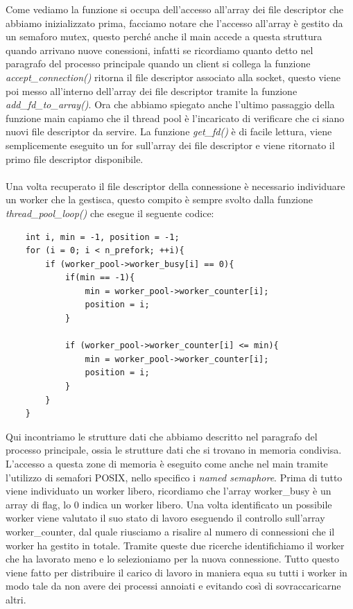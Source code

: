 \documentclass[italian]{tktltiki2}
\begin{document}
Come vediamo la funzione si occupa dell'accesso all'array dei file descriptor che abbiamo inizializzato prima, facciamo notare che l'accesso all'array è gestito da un semaforo mutex, questo perché anche il main accede a questa struttura quando arrivano nuove conessioni, infatti se ricordiamo quanto detto nel paragrafo del processo principale quando un client si collega la funzione \emph{accept\_connection()} ritorna il file descriptor associato alla socket, questo viene poi messo all'interno dell'array dei file descriptor tramite la funzione \emph{add\_fd\_to\_array()}. Ora che abbiamo spiegato anche l'ultimo passaggio della funzione main capiamo che il thread pool è l'incaricato di verificare che ci siano nuovi file descriptor da servire. La funzione \emph{get\_fd()} è di facile lettura, viene semplicemente eseguito un for sull'array dei file descriptor e viene ritornato il primo file descriptor disponibile.\\\\ Una volta recuperato il file descriptor della connessione è necessario individuare un worker che la gestisca, questo compito è sempre svolto dalla funzione \emph{thread\_pool\_loop()} che esegue il seguente codice:

\begin{lstlisting}
	int i, min = -1, position = -1;
	for (i = 0; i < n_prefork; ++i){
		if (worker_pool->worker_busy[i] == 0){
			if(min == -1){
				min = worker_pool->worker_counter[i];
              	position = i;
           	}

			if (worker_pool->worker_counter[i] <= min){
				min = worker_pool->worker_counter[i];
				position = i;
			}
		}
	}
\end{lstlisting}
Qui incontriamo le strutture dati che abbiamo descritto nel paragrafo del processo principale, ossia le strutture dati che si trovano in memoria condivisa. L'accesso a questa zone di memoria è eseguito come anche nel main tramite l'utilizzo di semafori POSIX, nello specifico i \emph{named semaphore}. Prima di tutto viene individuato un worker libero, ricordiamo che l'array worker\_busy è un array di flag, lo 0 indica un worker libero. Una volta identificato un possibile worker viene valutato il suo stato di lavoro eseguendo il controllo sull'array worker\_counter, dal quale riusciamo a risalire al numero di connessioni che il worker ha gestito in totale. Tramite queste due ricerche identifichiamo il worker che ha lavorato meno e lo selezioniamo per la nuova connessione. Tutto questo viene fatto per distribuire il carico di lavoro in maniera equa su tutti i worker in modo tale da non avere dei processi annoiati e evitando così di sovraccaricarne altri.\\\\
\end{document}
